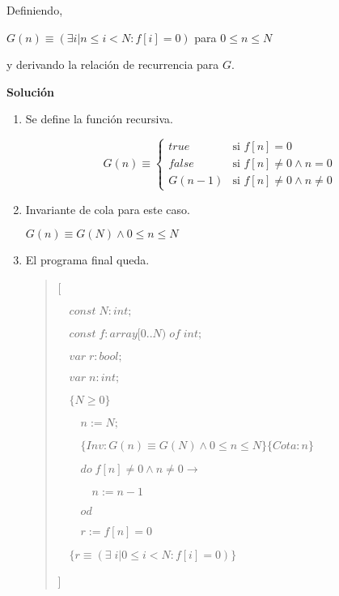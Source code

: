 \documentclass[hidelinks]{article}
\newenvironment{absolutelynopagebreak}
{\Needspace{10\baselineskip}\begin{quote}}
		{\end{quote}}
\begin{document}
Definiendo,\par

$G(n) \equiv (\exists i| n \leq i < N: f[i] = 0)$ para $0 \leq n \leq N$\par
y derivando la relación de recurrencia para $G$.\par

\textbf{Solución}\par

\begin{enumerate}
	\item Se define la función recursiva.\par

	      \begin{equation}
		      G(n) \equiv
		      \begin{cases}
			      true     & \text{si } f[n] = 0                   \\
			      false    & \text{si } f[n] \neq 0 \land n = 0    \\
			      G(n - 1) & \text{si } f[n] \neq 0 \land n \neq 0
		      \end{cases}
	      \end{equation} \par

	\item Invariante de cola para este caso.\par
	      \begin{center}
		      $G(n) \equiv G(N) \land 0 \leq n \leq N$
	      \end{center}

	\item El programa final queda.\par
	      \begin{absolutelynopagebreak}
		      [\par
		      $\quad const \; N: int;$\par
		      $\quad const \; f: array [0..N) \; of \; int;$\par
				      $\quad var \; r : bool;$\par
				      $\quad var \; n : int;$\par
				      $\quad \{N \geq 0\}$\par
				      $\qquad n := N;$\par
				      $\qquad \{Inv: G(n) \equiv G(N) \land 0 \leq n \leq N\} \{Cota: n\}$\par
				      $\qquad do \; f[n] \neq 0 \land n \neq 0 \rightarrow$\par
				      $\qquad \quad n := n - 1$\par
				      $\qquad od$\par
				      $\qquad r := f[n] = 0$\par
				      $\quad \{r \equiv (\exists \; i| 0 \leq i < N: f[i] = 0)\}$ \par
			      ]\par
	      \end{absolutelynopagebreak}\par

\end{enumerate}
\end{document}
